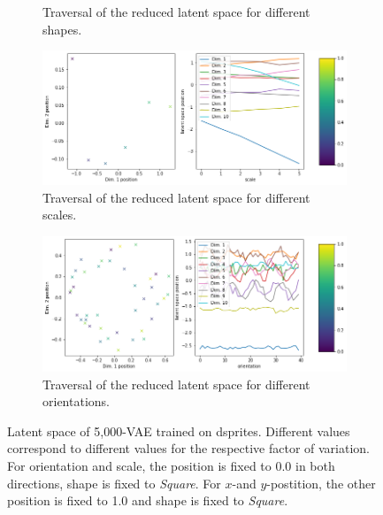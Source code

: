 \documentclass[11pt,a4paper]{article}
\begin{document}
\begin{figure}[H]
\begin{subfigure}{.48\textwidth}
\caption{Traversal of the reduced latent space for different shapes.}
\end{subfigure}
\begin{subfigure}{.48\textwidth}
\includegraphics[width=\textwidth]{images/latent_space_traversals/vae_5000_dsprites_latent_space_values_scale.png}
\caption{Traversal of the reduced latent space for different scales.}
\end{subfigure}
\begin{subfigure}{.48\textwidth}
\includegraphics[width=\textwidth]{images/latent_space_traversals/vae_5000_dsprites_latent_space_values_orientation.png}
\caption{Traversal of the reduced latent space for different orientations.}
\end{subfigure}
\caption[\ac{VAE} on dsprites: Latent Space Values]{Latent space of 5,000-\ac{VAE} trained on dsprites. Different values correspond to different values for the respective factor of variation. For orientation and scale, the position is fixed to 0.0 in both directions, shape is fixed to \textit{Square}. For $x$-and $y$-postition, the other position is fixed to 1.0 and shape is fixed to \textit{Square}.}
\label{fig:vae_dsprite_5000_latent_space_position}
\end{figure}
\end{document}
